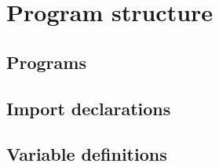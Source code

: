 \chapter{Program structure}
\label{programchapter}

\section{Programs}

\section{Import declarations}

\section{Variable definitions}
\label{defines}
